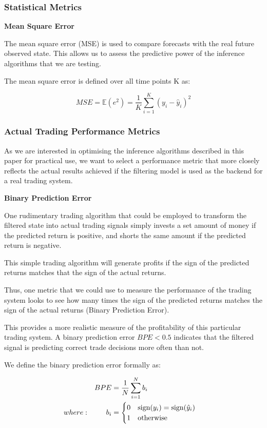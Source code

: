 \documentclass[../main.tex]{subfiles}
\begin{document}
\subsubsection{Statistical Metrics}

\textbf{Mean Square Error}
	
The mean square error (MSE) is used to compare forecasts with the real future observed state. This allows us to assess the predictive power of the inference algorithms that we are testing. 
	
The mean square error is defined over all time points K as: 

\begin{equation}
	MSE = \mathbb{E}(e^2) = \frac{1}{K} \sum_{i=1}^{K} (y_i - \hat{y}_i)^2
\end{equation}
	
	
\subsubsection{Actual Trading Performance Metrics} 

As we are interested in optimising the inference algorithms described in this paper for practical use, we want to select a performance metric that more closely reflects the actual results achieved if the filtering model is used as the backend for a real trading system. 


\textbf{Binary Prediction Error}

One rudimentary trading algorithm that could be employed to transform the filtered state into actual trading signals simply invests a set amount of money if the predicted return is positive, and shorts the same amount if the predicted return is negative.

This simple trading algorithm will generate profits if the sign of the predicted returns matches that the sign of the actual returns.

Thus, one metric that we could use to measure the performance of the trading system looks to see how many times the sign of the predicted returns matches the sign of the actual returns (Binary Prediction Error).
 
This provides a more realistic measure of the profitability of this particular trading system. A binary prediction error $BPE < 0.5$ indicates that the filtered signal is predicting correct trade decisions more often than not.

We define the binary prediction error formally as: 

\begin{align}
	&& BPE & = \frac{1}{N} \sum_{i=1}^N b_i && \notag \\
	& where: & b_i &= \begin{cases}
		0 & \text{sign}(y_i) = \text{sign}(\hat{y}_i) \\
		1 & \text{otherwise}
	\end{cases}
\end{align}
\end{document}
